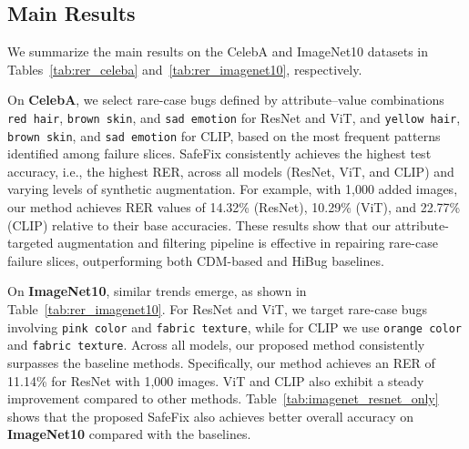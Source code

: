 \documentclass[10pt]{article} %
\newcommand{\model}{SafeFix\xspace}
\newcommand{\hibug}{HiBug\xspace}
\begin{document}
\subsection{Main Results} 
\label{sec:main_results}




We summarize the main results on the CelebA and ImageNet10 datasets in Tables~\ref{tab:rer_celeba} and~\ref{tab:rer_imagenet10}, respectively.



On \textbf{CelebA}, we select rare-case bugs defined by attribute–value combinations \texttt{red hair}, \texttt{brown skin}, and \texttt{sad emotion} for ResNet and ViT, and \texttt{yellow hair}, \texttt{brown skin}, and \texttt{sad emotion} for CLIP, based on the most frequent patterns identified among failure slices. \model{} consistently achieves the highest test accuracy, i.e., the highest RER, across all models (ResNet, ViT, and CLIP) and varying levels of synthetic augmentation. For example, with 1{,}000 added images, our method achieves RER values of 14.32\% (ResNet), 10.29\% (ViT), and 22.77\% (CLIP) relative to their base accuracies. These results show that our attribute-targeted augmentation and filtering pipeline is effective in repairing rare-case failure slices, outperforming both CDM-based and \hibug{} baselines.


On \textbf{ImageNet10}, similar trends emerge, as shown in Table~\ref{tab:rer_imagenet10}. For ResNet and ViT, we target rare-case bugs involving \texttt{pink color} and \texttt{fabric texture}, while for CLIP we use \texttt{orange color} and \texttt{fabric texture}. Across all models, our proposed method consistently surpasses the baseline methods. Specifically, our method achieves an RER of 11.14\% for ResNet with 1{,}000 images. ViT and CLIP also exhibit a steady improvement compared to other methods. Table~\ref{tab:imagenet_resnet_only} shows that the proposed SafeFix also achieves better overall accuracy on \textbf{ImageNet10} compared with the baselines.
\end{document}
